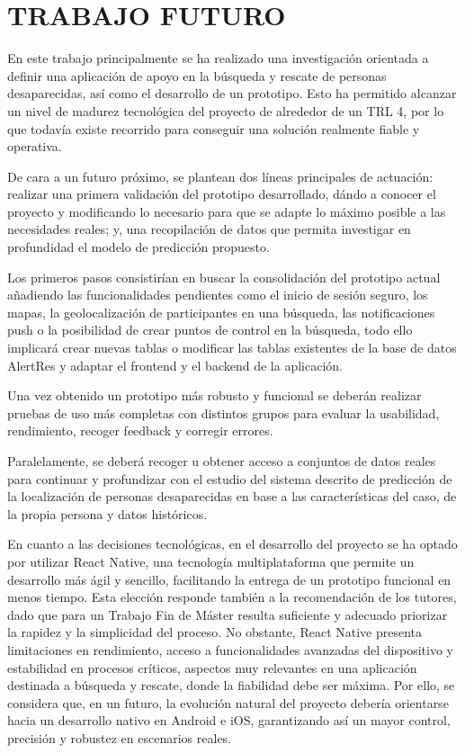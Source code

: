 \chapter{TRABAJO FUTURO} \label{TrabajoFuturo}
En este trabajo principalmente se ha realizado una investigación orientada a definir una aplicación de apoyo en la búsqueda y rescate de personas desaparecidas, así como el desarrollo de un prototipo. Esto ha permitido alcanzar un nivel de madurez tecnológica del proyecto de alrededor de un TRL 4, por lo que todavía existe recorrido para conseguir una solución realmente fiable y operativa.

De cara a un futuro próximo, se plantean dos líneas principales de actuación: realizar una primera validación del prototipo desarrollado, dándo a conocer el proyecto y modificando lo necesario para que se adapte lo máximo posible a las necesidades reales; y, una recopilación de datos que permita investigar en profundidad el modelo de predicción propuesto.

Los primeros pasos consistirían en buscar la consolidación del prototipo actual añadiendo las funcionalidades pendientes como el inicio de sesión seguro, los mapas, la geolocalización de participantes en una búsqueda, las notificaciones push o la posibilidad de crear puntos de control en la búsqueda, todo ello implicará crear nuevas tablas o modificar las tablas existentes de la base de datos AlertRes y adaptar el frontend y el backend de la aplicación.

Una vez obtenido un prototipo más robusto y funcional se deberán realizar pruebas de uso más completas con distintos grupos para evaluar la usabilidad, rendimiento, recoger feedback y corregir errores. 

Paralelamente, se deberá recoger u obtener acceso a  conjuntos de datos reales para continuar y profundizar con el estudio del sistema descrito de predicción de la localización de personas desaparecidas en base a las características del caso, de la propia persona y datos históricos. 

En cuanto a las decisiones tecnológicas, en el desarrollo del proyecto se ha optado por utilizar React Native, una tecnología multiplataforma que permite un desarrollo más ágil y sencillo, facilitando la entrega de un prototipo funcional en menos tiempo. Esta elección responde también a la recomendación de los tutores, dado que para un Trabajo Fin de Máster resulta suficiente y adecuado priorizar la rapidez y la simplicidad del proceso. No obstante, React Native presenta limitaciones en rendimiento, acceso a funcionalidades avanzadas del dispositivo y estabilidad en procesos críticos, aspectos muy relevantes en una aplicación destinada a búsqueda y rescate, donde la fiabilidad debe ser máxima. Por ello, se considera que, en un futuro, la evolución natural del proyecto debería orientarse hacia un desarrollo nativo en Android e iOS, garantizando así un mayor control, precisión y robustez en escenarios reales.

